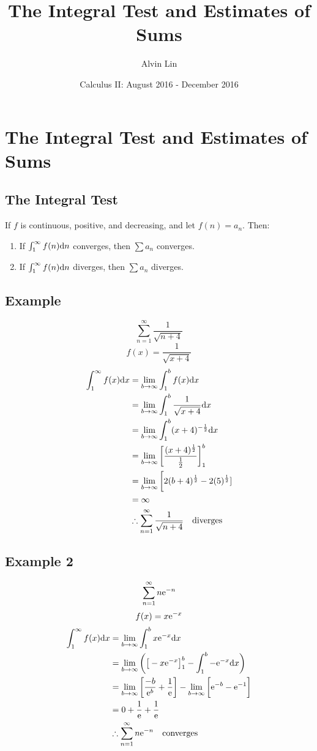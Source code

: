 \documentclass[letterpaper, 12pt]{math}
\title{The Integral Test and Estimates of Sums}
\author{Alvin Lin}
\date{Calculus II: August 2016 - December 2016}
\begin{document}
\maketitle

\section*{The Integral Test and Estimates of Sums}

\subsection*{The Integral Test}
If \( f \) is continuous, positive, and decreasing, and let \( f(n) = a_{n} \).
Then:
\begin{enumerate}
  \item If \( \int_{1}^{\infty}f(n)\mathrm{d}{n} \) converges, then
    \( \sum{a_{n}} \) converges.
  \item If \( \int_{1}^{\infty}f(n)\mathrm{d}{n} \) diverges, then
    \( \sum{a_{n}} \) diverges.
\end{enumerate}

\subsection*{Example}
\[ \sum_{n=1}^{\infty}\frac{1}{\sqrt{n+4}} \]
\[ f(x) = \frac{1}{\sqrt{x+4}} \]
\begin{align*}
  \int_{1}^{\infty}f(x)\mathrm{d}{x} &=
    \lim_{b\to\infty}\int_{1}^{b}f(x)\mathrm{d}{x} \\
  &= \lim_{b\to\infty}\int_{1}^{b}\frac{1}{\sqrt{x+4}}\mathrm{d}{x} \\
  &= \lim_{b\to\infty}\int_{1}^{b}(x+4)^{-\frac{1}{2}}\mathrm{d}{x} \\
  &= \lim_{b\to\infty}\bigg[
    \frac{(x+4)^{\frac{1}{2}}}{\frac{1}{2}}\bigg]_{1}^{b} \\
  &= \lim_{b\to\infty}\bigg[2(b+4)^{\frac{1}{2}}-2(5)^{\frac{1}{2}}] \\
  &= \infty \\
  & \therefore \sum_{n=1}^{\infty}\frac{1}{\sqrt{n+4}} \quad \mathrm{diverges}
\end{align*}

\subsection*{Example 2}
\[ \sum_{n=1}^{\infty}n\mathrm{e}^{-n} \]
\[ f(x) = x\mathrm{e}^{-x} \]
\begin{align*}
  \int_{1}^{\infty}f(x)\mathrm{d}{x} &=
    \lim_{b\to\infty}\int_{1}^{b}x\mathrm{e}^{-x}\mathrm{d}{x} \\
  &= \lim_{b\to\infty}\bigg(\big[-x\mathrm{e}^{-x}\big]_{1}^{b}-
    \int_{1}^{b}-\mathrm{e}^{-x}\mathrm{d}{x}\bigg) \\
  &= \lim_{b\to\infty}\bigg[\frac{-b}{\mathrm{e}^{b}}+\frac{1}{\mathrm{e}}\bigg]-
    \lim_{b\to\infty}\bigg[\mathrm{e}^{-b}-\mathrm{e}^{-1}\bigg] \\
  &= 0+\frac{1}{\mathrm{e}}+\frac{1}{\mathrm{e}} \\
  & \therefore \sum_{n=1}^{\infty}n\mathrm{e}^{-n} \quad \mathrm{converges}
\end{align*}
\end{document}

